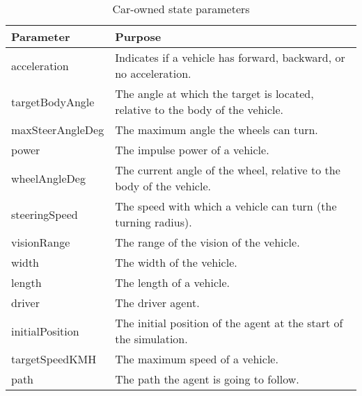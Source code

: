 


		\begin{table}[H]
			\centering
			\begin{tabular}{|l | p{10.5cm} |}
				\hline
				Parameter				& Purpose \\ \hline \hline
				acceleration 			& Indicates if a vehicle has forward, backward, or no acceleration. \\ \hline
				targetBodyAngle 		& The angle at which the target is located, relative to the body of the vehicle. \\ \hline
				maxSteerAngleDeg 		& The maximum angle the wheels can turn. \\ \hline
				power 					& The impulse power of a vehicle. \\ \hline
				wheelAngleDeg 			& The current angle of the wheel, relative to the body of the vehicle. \\ \hline
				steeringSpeed 			& The speed with which a vehicle can turn (the turning radius). \\ \hline
				visionRange 			& The range of the vision of the vehicle. \\ \hline
				width 					& The width of the vehicle. \\ \hline
				length 					& The length of a vehicle. \\ \hline
				driver 					& The driver agent. \\ \hline
				initialPosition 		& The initial position of the agent at the start of the simulation. \\ \hline
				targetSpeedKMH			& The maximum speed of a vehicle. \\ \hline
				path					& The path the agent is going to follow. \\ \hline
			\end{tabular}
			\caption{Car-owned state parameters}
			\label{tab:par:method:model:overview:state:lowlevel:car}
		\end{table}

